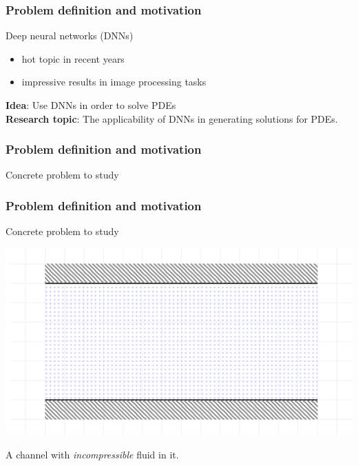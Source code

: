 \documentclass[18pt]{beamer}
\begin{document}
\begin{frame}
  \frametitle{Problem definition and motivation}
  Deep neural networks (DNNs)
  \begin{itemize}
  \item hot topic in recent years
  \item impressive results in image processing tasks
  \end{itemize}
  \textbf{Idea}: Use DNNs in order to solve PDEs \\
  \pause
  \vspace{1cm}
  \textbf{Research topic}: The applicability of DNNs in generating solutions for PDEs.
\end{frame}



\begin{frame}[t]
  \frametitle{Problem definition and motivation}
  Concrete problem to study
\end{frame}


\begin{frame}[t]
  \frametitle{Problem definition and motivation}
  Concrete problem to study
  \vspace*{0.3cm}
  \begin{center}
    \includegraphics[scale=0.2]{images/channel/flow_0}
  \end{center}
  A channel with \textit{incompressible} fluid in it.
\end{frame}
\end{document}
